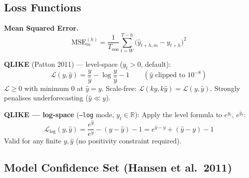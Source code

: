 \documentclass[11pt, a4paper]{article}
\begin{document}
\begin{algorithm}[H]
\caption{Rolling OOS Evaluation}
\end{algorithm}

\subsection{Loss Functions}

\textbf{Mean Squared Error.}
\begin{equation}
  \mathrm{MSE}^{(h)}_m = \frac{1}{T_{\mathrm{oos}}}
    \sum_{t=W}^{T-h} \bigl(\hat{y}_{t+h,m} - y_{t+h}\bigr)^2
\end{equation}

\textbf{QLIKE} (Patton 2011) — level-space ($y_t > 0$, default):
\begin{equation}
  \mathcal{L}(y,\hat{y}) = \frac{y}{\hat{y}} - \log\frac{y}{\hat{y}} - 1
  \qquad (\hat{y} \text{ clipped to } 10^{-8})
\end{equation}
$\mathcal{L} \geq 0$ with minimum 0 at $\hat{y}=y$.
Scale-free: $\mathcal{L}(ky,k\hat{y}) = \mathcal{L}(y,\hat{y})$.
Strongly penalises underforecasting ($\hat{y} \ll y$).

\textbf{QLIKE — log-space} (\texttt{--log} mode, $y_t \in \mathbb{R}$):
Apply the level formula to $e^{y_t},\,e^{\hat{y}_t}$:
\begin{equation}
  \mathcal{L}_{\log}(y,\hat{y})
    = \frac{e^{\hat{y}}}{e^{y}} - \left(y - \hat{y}\right) - 1
    = e^{\hat{y}-y} + (\hat{y}-y) - 1
\end{equation}
Valid for any finite $y,\hat{y}$ (no positivity constraint required).

\subsection{Model Confidence Set (Hansen et al.\ 2011)}
\end{document}
